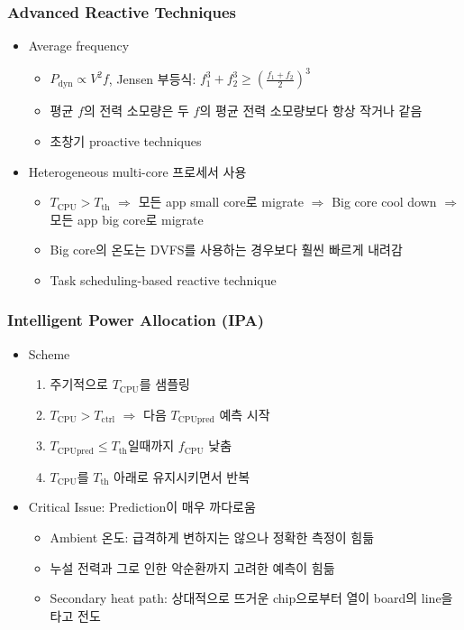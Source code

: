 \subsubsection*{Advanced Reactive Techniques}
\begin{itemize}
    \item Average frequency
    \begin{itemize}
        \item $P_\mathrm{dyn}\varpropto V^2f$, Jensen 부등식: $f_1^3 + f_2^3 \geq \left(\frac{f_1+f_2}{2}\right)^3$
        \item 평균 $f$의 전력 소모량은 두 $f$의 평균 전력 소모량보다 항상 작거나 같음
        \item 초창기 proactive techniques
    \end{itemize}
    \newpage
    \item Heterogeneous multi-core 프로세서 사용
    \begin{itemize}
        \item $T_\mathrm{CPU} > T_\mathrm{th}$ $\Rightarrow$ 모든 app small core로 migrate $\Rightarrow$ Big core cool down $\Rightarrow$ 모든 app big core로 migrate
        \item Big core의 온도는 DVFS를 사용하는 경우보다 훨씬 빠르게 내려감
        \item Task scheduling-based reactive technique
    \end{itemize}
\end{itemize}

\subsubsection*{Intelligent Power Allocation (IPA)}
\begin{itemize}
    \item Scheme
    \begin{enumerate}
        \item 주기적으로 $T_\mathrm{CPU}$를 샘플링
        \item $T_\mathrm{CPU} > T_\mathrm{ctrl}$ $\Rightarrow$ 다음 $T_\mathrm{CPUpred}$ 예측 시작
        \item $T_\mathrm{CPUpred}\leq T_\mathrm{th}$일때까지 $f_\mathrm{CPU}$ 낮춤
        \item $T_\mathrm{CPU}$를 $T_\mathrm{th}$ 아래로 유지시키면서 반복
    \end{enumerate}
    \item Critical Issue: Prediction이 매우 까다로움
    \begin{itemize}
        \item Ambient 온도: 급격하게 변하지는 않으나 정확한 측정이 힘듦
        \item 누설 전력과 그로 인한 악순환까지 고려한 예측이 힘듦
        \item Secondary heat path: 상대적으로 뜨거운 chip으로부터 열이 board의 line을 타고 전도
    \end{itemize}
\end{itemize}


